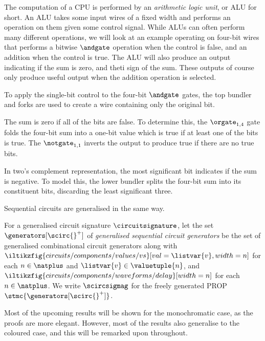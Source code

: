 \begin{example}[ALU]
    The computation of a CPU is performed by an \emph{arithmetic logic unit},
    or ALU for short.
    An ALU takes some input wires of a fixed width and performs an operation
    on them given some control signal.
    While ALUs can often perform many different operations, we will look at an
    example operating on four-bit wires that performs a bitwise \(\andgate\)
    operation when the control is false, and an addition when the control is
    true.
    The ALU will also produce an output indicating if the sum is zero, and theti
    sign of the sum.
    These outputs of course only produce useful output when the addition
    operation is selected.

    \begin{center}
    \end{center}

    To apply the single-bit control to the four-bit \(\andgate\) gates, the
    top bundler and forks are used to create a wire containing only the
    original bit.

    The sum is zero if all of the bits are false.
    To determine this, the \(\orgate_{1,4}\) gate folds the four-bit sum into
    a one-bit value which is true if at least one of the bits is true.
    The \(\notgate_{1,1}\) inverts the output to produce true if there are no
    true bits.

    In two's complement representation, the most significant bit indicates if
    the sum is negative.
    To model this, the lower bundler splits the four-bit sum into its
    constituent bits, discarding the least significant three.
\end{example}

Sequential circuits are generalised in the same way.

\begin{definition}
    For a generalised circuit signature \(\circuitsignature\), let the set
    \(\generators[\scirc{}^+]\) of
    \emph{generalised sequential circuit generators} be the set of
    generalised combinational circuit generators along with
    \(
    \iltikzfig{circuits/components/values/vs}[val=\listvar{v},width=n]
    \) for each \(n \in \natplus\) and \(\listvar{v} \in \valuetuple{n}\), and
    \(
    \iltikzfig{circuits/components/waveforms/delay}[width=n]
    \) for each \(n \in \natplus\).
    We write \(\scircsigmag\) for the freely generated PROP
    \(\stmc{\generators[\scirc{}^+]}\).
\end{definition}

Most of the upcoming results will be shown for the monochromatic case, as the
proofs are more elegant.
However, most of the results also generalise to the coloured case, and this will
be remarked upon throughout.

